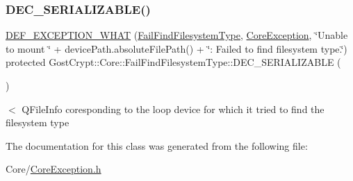 \subsubsection{\texorpdfstring{D\+E\+C\+\_\+\+S\+E\+R\+I\+A\+L\+I\+Z\+A\+B\+L\+E()}{DEC\_SERIALIZABLE()}}
{\footnotesize\ttfamily \hyperlink{_gost_crypt_exception_8h_a5bc1e1c6c9d6f46c84eeba49e33355f9}{D\+E\+F\+\_\+\+E\+X\+C\+E\+P\+T\+I\+O\+N\+\_\+\+W\+H\+AT} (\hyperlink{class_gost_crypt_1_1_core_1_1_fail_find_filesystem_type}{Fail\+Find\+Filesystem\+Type}, \hyperlink{class_gost_crypt_1_1_core_1_1_core_exception}{Core\+Exception}, \char`\"{}Unable to mount \char`\"{} + device\+Path.\+absolute\+File\+Path() + \char`\"{}\+: Failed to find filesystem type.\char`\"{}) protected Gost\+Crypt\+::\+Core\+::\+Fail\+Find\+Filesystem\+Type\+::\+D\+E\+C\+\_\+\+S\+E\+R\+I\+A\+L\+I\+Z\+A\+B\+LE (\begin{DoxyParamCaption}\item[{\hyperlink{class_gost_crypt_1_1_core_1_1_fail_find_filesystem_type}{Fail\+Find\+Filesystem\+Type}}]{ }\end{DoxyParamCaption})}

$<$ Q\+File\+Info coresponding to the loop device for which it tried to find the filesystem type 

The documentation for this class was generated from the following file\+:\begin{DoxyCompactItemize}
\item 
Core/\hyperlink{_core_exception_8h}{Core\+Exception.\+h}\end{DoxyCompactItemize}
